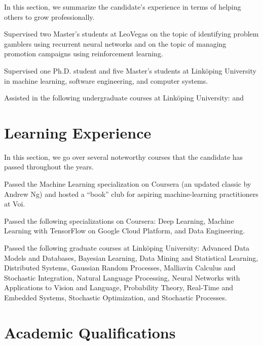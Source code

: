 \documentclass[journal]{IEEEtran}
\begin{document}
In this section, we summarize the candidate's experience in terms of helping
others to grow professionally.

\date{2018--2019} Supervised two Master's students at LeoVegas on the topic of
identifying problem gamblers using recurrent neural networks and on the topic of
managing promotion campaigns using reinforcement learning.

\date{2011--2017} Supervised one Ph.D. student and five Master's students at
Linköping University in machine learning, software engineering, and computer
systems.

\date{2011--2017} Assisted in the following undergraduate courses at Linköping
University:  
 and

\section{Learning Experience} 

In this section, we go over several noteworthy courses that the candidate has
passed throughout the years.

\date{2022} Passed the Machine Learning specialization on Coursera (an updated
classic by Andrew Ng) and hosted a ``book'' club for aspiring machine-learning
practitioners at Voi.

\date{2018--2019} Passed the following specializations on Coursera: Deep
Learning, Machine Learning with TensorFlow on Google Cloud Platform, and Data
Engineering.

\date{2011--2017} Passed the following graduate courses at Linköping University:
Advanced Data Models and Databases, Bayesian Learning, Data Mining and
Statistical Learning, Distributed Systems, Gaussian Random Processes, Malliavin
Calculus and Stochastic Integration, Natural Language Processing, Neural
Networks with Applications to Vision and Language, Probability Theory, Real-Time
and Embedded Systems, Stochastic Optimization, and Stochastic Processes.

\section{Academic Qualifications} 
\end{document}
